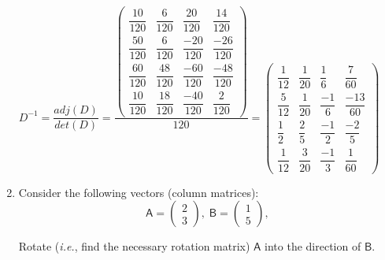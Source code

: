 \documentclass[fleqn]{article}
\begin{document}
\begin{enumerate}
    $D^{-1}= \dfrac{adj(D)}{det(D)}=\dfrac{
      \begin{pmatrix}
        \dfrac{10}{120} & \dfrac{6}{120} & \dfrac{20}{120} & \dfrac{14}{120} \\ 
        \dfrac{50}{120} & \dfrac{6}{120} & \dfrac{-20}{120} & \dfrac{-26}{120} \\ 
        \dfrac{60}{120} & \dfrac{48}{120} & \dfrac{-60}{120} & \dfrac{-48}{120} \\ 
        \dfrac{10}{120} & \dfrac{18}{120} & \dfrac{-40}{120} & \dfrac{2}{120}
       \end{pmatrix}
    }{120}
    =
    \begin{pmatrix}
      \dfrac{1}{12} & \dfrac{1}{20} & \dfrac{1}{6} & \dfrac{7}{60} \\ 
      \dfrac{5}{12} & \dfrac{1}{20} & \dfrac{-1}{6} & \dfrac{-13}{60} \\ 
      \dfrac{1}{2} & \dfrac{2}{5} & \dfrac{-1}{2} & \dfrac{-2}{5} \\  
      \dfrac{1}{12} & \dfrac{3}{20} & \dfrac{-1}{3} & \dfrac{1}{60}
     \end{pmatrix}
    $

  
  \item  Consider the following vectors (column matrices):
    \[
    \mathsf{A}=\left( 
    \begin{array}{l}
    2 \\ 
    3
    \end{array}
    \right) ,\;\mathsf{B}=\left( 
    \begin{array}{l}
    1 \\ 
    5
    \end{array}
    \right) ,
    \]

  Rotate ({\it i.e.}, find the necessary rotation matrix) $\mathsf{A}$ into the direction of $\mathsf{B}$.



\end{enumerate}
\end{document}
